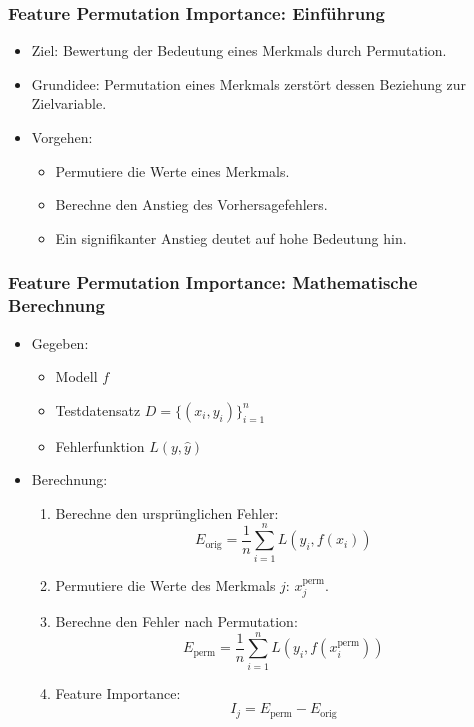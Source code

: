 \documentclass[aspectratio=1610, xcolor=dvipsnames, 9pt]{beamer}
\begin{document}
\begin{frame}
  \frametitle{Feature Permutation Importance: Einführung}
  \begin{itemize}
    \item Ziel: Bewertung der Bedeutung eines Merkmals durch Permutation.
    \item Grundidee: Permutation eines Merkmals zerstört dessen Beziehung zur Zielvariable.
    \item Vorgehen:
    \begin{itemize}
      \item Permutiere die Werte eines Merkmals.
      \item Berechne den Anstieg des Vorhersagefehlers.
      \item Ein signifikanter Anstieg deutet auf hohe Bedeutung hin.
    \end{itemize}
  \end{itemize}
\end{frame}

\begin{frame}
  \frametitle{Feature Permutation Importance: Mathematische Berechnung}
  \begin{itemize}
    \item Gegeben:
    \begin{itemize}
      \item Modell $f$
      \item Testdatensatz $D = \{(x_i, y_i)\}_{i=1}^n$
      \item Fehlerfunktion $L(y, \hat{y})$
    \end{itemize}
    \item Berechnung:
    \begin{enumerate}
      \item Berechne den ursprünglichen Fehler:
      \[
      E_{\text{orig}} = \frac{1}{n} \sum_{i=1}^n L(y_i, f(x_i))
      \]
      \item Permutiere die Werte des Merkmals $j$: $x_j^{\text{perm}}$.
      \item Berechne den Fehler nach Permutation:
      \[
      E_{\text{perm}} = \frac{1}{n} \sum_{i=1}^n L(y_i, f(x_i^{\text{perm}}))
      \]
      \item Feature Importance:
      \[
      I_j = E_{\text{perm}} - E_{\text{orig}}
      \]
    \end{enumerate}
  \end{itemize}
\end{frame}
\end{document}
